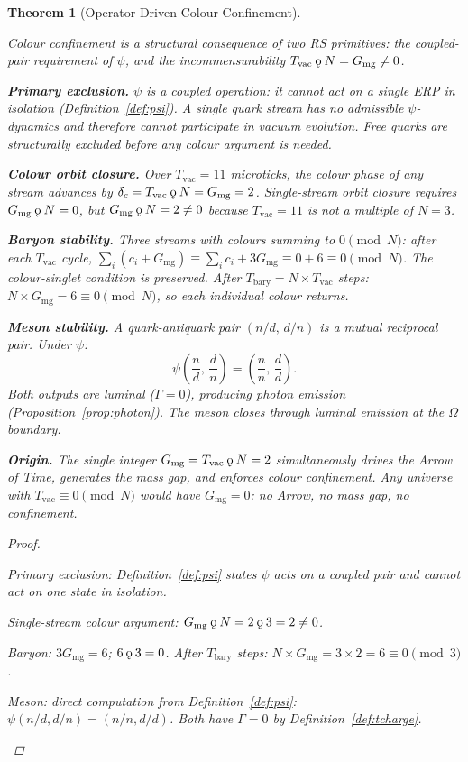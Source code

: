 \documentclass[11pt,letterpaper]{article}
\theoremstyle{plain}
\newtheorem{theorem}{Theorem}[section]
\theoremstyle{definition}
\theoremstyle{remark}
\newcommand{\koppa}{\mathbin{\text{\rm\k{o}}}}
\newcommand{\Tbary}{T_{\mathrm{bary}}}
\newcommand{\Tcharge}{\Gamma}
\newcommand{\Gmg}{G_{\mathrm{mg}}}
\newcommand{\Tvac}{T_{\mathrm{vac}}}
\begin{document}
\begin{theorem}[Operator-Driven Colour
Confinement]\label{thm:confinement}
\begin{rsbox}
Colour confinement is a structural consequence of two RS primitives:
the coupled-pair requirement of $\psi$, and the incommensurability
$\Tvac\koppa N=\Gmg\neq0$.

\medskip\noindent\textbf{Primary exclusion.}
$\psi$ is a coupled operation: it cannot act on a single ERP in
isolation (Definition~\ref{def:psi}).  A single quark stream has no
admissible $\psi$-dynamics and therefore cannot participate in
vacuum evolution.  Free quarks are structurally excluded before any
colour argument is needed.

\medskip\noindent\textbf{Colour orbit closure.}
Over $\Tvac=11$ microticks, the colour phase of any stream advances
by $\delta_c=\Tvac\koppa N=\Gmg=2$.  Single-stream orbit closure
requires $\Gmg\koppa N=0$, but $\Gmg\koppa N=2\neq0$ because
$\Tvac=11$ is not a multiple of $N=3$.

\medskip\noindent\textbf{Baryon stability.}
Three streams with colours summing to $0\pmod{N}$: after each
$\Tvac$ cycle, $\sum_i(c_i+\Gmg)\equiv\sum_ic_i+3\Gmg\equiv0+6
\equiv0\pmod{N}$.  The colour-singlet condition is preserved.  After
$\Tbary=N\times\Tvac$ steps: $N\times\Gmg=6\equiv0\pmod{N}$, so
each individual colour returns.

\medskip\noindent\textbf{Meson stability.}
A quark-antiquark pair $(n/d,\,d/n)$ is a mutual reciprocal pair.
Under $\psi$:
\[
\psi\!\left(\frac{n}{d},\,\frac{d}{n}\right)
=\left(\frac{n}{n},\,\frac{d}{d}\right).
\]
Both outputs are luminal ($\Tcharge=0$), producing photon emission
(Proposition~\ref{prop:photon}).  The meson closes through luminal
emission at the $\Omega$ boundary.

\medskip\noindent\textbf{Origin.}
The single integer $\Gmg=\Tvac\koppa N=2$ simultaneously drives the
Arrow of Time, generates the mass gap, and enforces colour
confinement.  Any universe with $\Tvac\equiv0\pmod{N}$ would have
$\Gmg=0$: no Arrow, no mass gap, no confinement.
\end{rsbox}
\begin{proof}
\begin{rsbox}
Primary exclusion: Definition~\ref{def:psi} states $\psi$ acts on
a coupled pair and cannot act on one state in isolation.

Single-stream colour argument: $\Gmg\koppa N=2\koppa3=2\neq0$.

Baryon: $3\Gmg=6$; $6\koppa3=0$. After $\Tbary$ steps:
$N\times\Gmg=3\times2=6\equiv0\pmod3$.

Meson: direct computation from Definition~\ref{def:psi}:
$\psi(n/d,d/n)=(n/n,d/d)$.  Both have $\Tcharge=0$ by
Definition~\ref{def:tcharge}.
\end{rsbox}
\end{proof}
\end{theorem}
\end{document}
